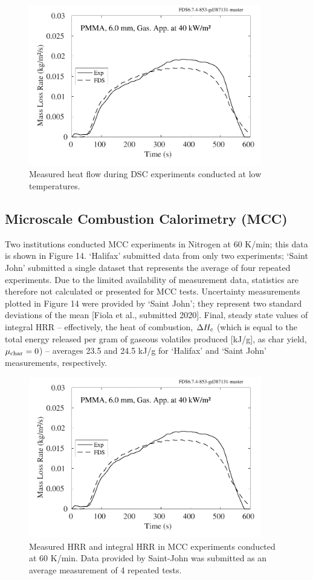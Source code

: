 \documentclass{book}
\begin{document}
\begin{figure}
  \centering
  \includegraphics[width=4in]{SCRIPT_FIGURES/PMMA_40}
  \caption{Measured heat flow during DSC experiments conducted at low temperatures.}
  \label{Fig_13}
\end{figure}


\subsection{Microscale Combustion Calorimetry (MCC)}

Two institutions conducted MCC experiments in Nitrogen at 60 K/min; this data is shown in Figure 14. ‘Halifax’ submitted data from only two experiments; ‘Saint John’ submitted a single dataset that represents the average of four repeated experiments.  Due to the limited availability of measurement data, statistics are therefore not calculated or presented for MCC tests. Uncertainty measurements plotted in Figure 14 were provided by ‘Saint John’; they represent two standard deviations of the mean [Fiola et al., submitted 2020]. Final, steady state values of integral HRR – effectively, the heat of combustion, $\Delta H_{\rm c}$ (which is equal to the total energy released per gram of gaseous volatiles produced [kJ/g], as char yield, $\mu_{\rm char}=0$) – averages 23.5 and 24.5 kJ/g for ‘Halifax’ and ‘Saint John’ measurements, respectively.

\begin{figure}
  \centering
  \includegraphics[width=4in]{SCRIPT_FIGURES/PMMA_40}
  \caption{Measured HRR and integral HRR in MCC experiments conducted at 60 K/min. Data provided by Saint-John was submitted as an average measurement of 4 repeated tests.}
  \label{Fig_14}
\end{figure}
\end{document}
